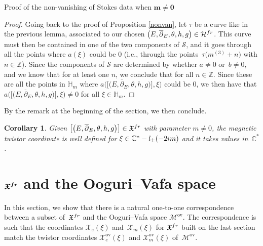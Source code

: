 \documentclass[11pt]{article}
\numberwithin{equation}{section}
\newtheorem{Corollary}[Theorem]{Corollary}
\numberwithin{equation}{section}
\newcommand{\MC}{\mathcal{X}_m}
\begin{document}
\begin{subsubsection}{Proof of the non-vanishing of Stokes data when $\boldsymbol{m\neq 0}$}
\begin{proof}
Going back to the proof of Proposition \ref{nonvan}, let $\tau$ be a curve like in the previous lemma, associated to our chosen $\bigl(E,\overline{\partial}_E,\theta,h,g\bigr) \in \mathcal{H}^{{\rm fr}}$. This curve must then be contained in one of the two components of $\mathcal{S}$, and it goes through all the points where $a(\xi)$ could be $0$ (i.e., through the points~${\tau\bigl(m^{(3)}+n\bigr)}$ with $n \in \mathbb{Z}$). Since the components of $\mathcal{S}$ are determined by whether $a\neq0$ or~${b\neq 0}$, and we know that  for at least one $n$, we conclude that  for all $n \in \mathbb{Z}$. Since these are all the points in $\mathbb{H}_m$ where $a\bigl(\bigl[\bigl(E,\overline{\partial}_E,\theta,h,g\bigr)\bigr],\xi\bigr)$ could be $0$, we then have that $a\bigl(\bigl[\bigl(E,\overline{\partial}_E,\theta,h,g\bigr)\bigr],\xi\bigr)\neq 0$ for all $\xi \in \mathbb{H}_m$.
\end{proof}

By the remark at the beginning of the section, we then conclude.
\begin{Corollary} Given $\bigl[\bigl(E,\overline{\partial}_E,\theta,h,g\bigr)\bigr] \in \mathfrak{X}^{{\rm fr}}$ with parameter $m\neq 0$, the magnetic twistor coordinate \smash{$\MC\bigl(\bigl[\bigl(E,\overline{\partial}_E,\theta,h,g\bigr)\bigr],\xi\bigr)$} is well defined for $\xi \in \mathbb{C}^*-l_{\pm}(-2{\rm i}m)$ and it takes values in~$\mathbb{C}^*$.
\end{Corollary}
\end{subsubsection}

\section[X\^{}\{fr\} and the Ooguri--Vafa space]{$\boldsymbol{\mathfrak{X}^{{\rm fr}}}$ and the Ooguri--Vafa space}\label{sec4}

In this section, we show that there is a natural one-to-one correspondence between a subset of~$\mathfrak{X}^{{\rm fr}}$ and the Ooguri--Vafa space $\mathcal{M}^{\text{ov}}$. The correspondence is such that the coordinates $\mathcal{X}_e(\xi)$ and~$\mathcal{X}_m(\xi)$ for $\mathfrak{X}^{{\rm fr}}$ built on the last section match the twistor coordinates $\mathcal{X}_e^{\text{ov}}(\xi)$ and $\mathcal{X}_m^{\text{ov}}(\xi)$ of~$\mathcal{M}^{\text{ov}}$.
\end{document}
